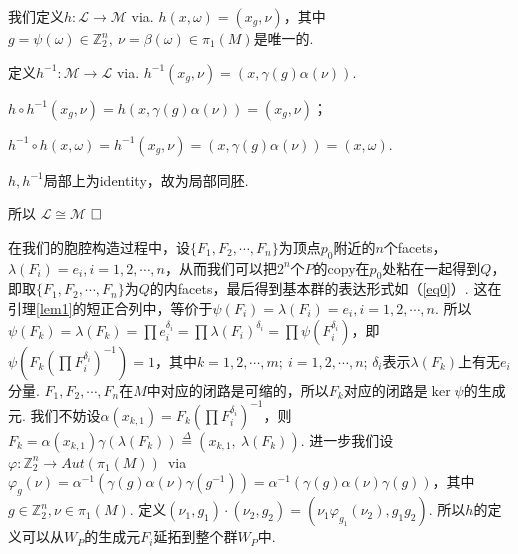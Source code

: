 \documentclass{article}
\theoremstyle{plain}%
\theoremstyle{definition}
\theoremstyle{remark}
\begin{document}
我们定义$h:\mathcal{L}\longrightarrow \mathcal{M}$ via. $h(x,\omega)=(x_g,\nu)$，其中$g=\psi(\omega)\in\mathbb{Z}_2^n,~\nu=\beta(\omega)\in \pi_1(M)$是唯一的.

定义$h^{-1}:\mathcal{M}\longrightarrow \mathcal{L}$ via.
$h^{-1}(x_g,\nu)=(x,\gamma(g)\alpha(\nu))$.

$h\circ h^{-1}(x_g,\nu)=h(x,\gamma(g)\alpha(\nu))=(x_g,\nu)$；

$h^{-1}\circ h(x,\omega)=h^{-1}(x_g,\nu)=(x,\gamma(g)\alpha(\nu))=(x,\omega)$.

$h,h^{-1}$局部上为identity，故为局部同胚.

所以 $\mathcal{L}\cong \mathcal{M}$  $\hfill{} \Box$


{\rem 在我们的胞腔构造过程中，设$\{F_1,F_2,\cdots,F_n\}$为顶点$p_0$附近的$n$个facets，$\lambda(F_i)=e_i, i=1,2,\cdots,n$，从而我们可以把$2^n$个$P$的copy在$p_0$处粘在一起得到$Q$，即取$\{F_1,F_2,\cdots,F_n\}$为$Q$的内facets，最后得到基本群的表达形式如（\ref{eq0}）. 这在引理\ref{lem1}的短正合列中，等价于$\psi(F_i)=\lambda(F_i)=e_i, i=1,2,\cdots,n$. 
所以
$\psi(F_k)=\lambda(F_k)=\prod  e_i^{\delta_i}=\prod  \lambda(F_i)^{\delta_i}=\prod  \psi( F_i^{\delta_i})$，即$\psi(F_k\left(\prod F_i^{\delta_i}\right)^{-1})=1$，其中$k=1,2,\cdots,m;~i=1,2,\cdots,n$; $\delta_i$表示$\lambda(F_k)$上有无$e_i$分量. $F_1,F_2,\cdots,F_n$在$M$中对应的闭路是可缩的，所以$F_k$对应的闭路是$\ker \psi$的生成元.
我们不妨设$\alpha(x_{k,1})=F_k\left(\prod F_i^{\delta_i}\right)^{-1}$，则$F_k=\alpha(x_{k,1})\gamma(\lambda(F_k))\overset{\Delta}{=}(x_{k,1},~\lambda(F_k))$.
进一步我们设$\varphi:\mathbb{Z}_2^n\longrightarrow Aut(\pi_1(M))$~via ~$\varphi_g(\nu)=\alpha^{-1}(\gamma(g)\alpha(\nu)\gamma(g^{-1}))=\alpha^{-1}(\gamma(g)\alpha(\nu)\gamma(g))$，其中$g\in \mathbb{Z}_2^n, \nu\in \pi_1(M)$. 定义$(\nu_1,g_1)\cdot(\nu_2,g_2)=(\nu_1\varphi_{g_1}(\nu_2),g_1g_2)$. 所以$h$的定义可以从$W_P$的生成元$F_i$延拓到整个群$W_P$中.

}
\end{document}
